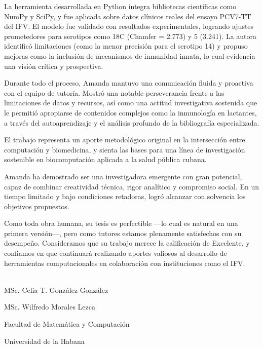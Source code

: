 \begin{opinion}
La herramienta desarrollada en Python integra bibliotecas científicas como NumPy y SciPy, y fue aplicada sobre datos clínicos reales del ensayo PCV7-TT del IFV. El modelo fue validado con resultados experimentales, logrando ajustes prometedores para serotipos como 18C (Chamfer = 2.773) y 5 (3.241). La autora identificó limitaciones (como la menor precisión para el serotipo 14) y propuso mejoras como la inclusión de mecanismos de inmunidad innata, lo cual evidencia una visión crítica y prospectiva.

Durante todo el proceso, Amanda mantuvo una comunicación fluida y proactiva con el equipo de tutoría. Mostró una notable perseverancia frente a las limitaciones de datos y recursos, así como una actitud investigativa sostenida que le permitió apropiarse de contenidos complejos como la inmunología en lactantes, a través del autoaprendizaje y el análisis profundo de la bibliografía especializada.

El trabajo representa un aporte metodológico original en la intersección entre computación y biomedicina, y sienta las bases para una línea de investigación sostenible en biocomputación aplicada a la salud pública cubana.

Amanda ha demostrado ser una investigadora emergente con gran potencial, capaz de combinar creatividad técnica, rigor analítico y compromiso social. En un tiempo limitado y bajo condiciones retadoras, logró alcanzar con solvencia los objetivos propuestos.

Como toda obra humana, su tesis es perfectible —lo cual es natural en una primera versión—, pero como tutores estamos plenamente satisfechos con su desempeño. Consideramos que su trabajo merece la calificación de Excelente, y confiamos en que continuará realizando aportes valiosos al desarrollo de herramientas computacionales en colaboración con instituciones como el IFV.


\begin{flushleft}
	

	
	\underline{\hspace{6.5cm}}\\
	
	\qquad MSc. Celia T. González González
	
	\qquad MSc. Wilfredo Morales Lezca
	
	\qquad Facultad de Matemática y Computación
	
	\qquad Universidad de la Habana
\end{flushleft}

\end{opinion}